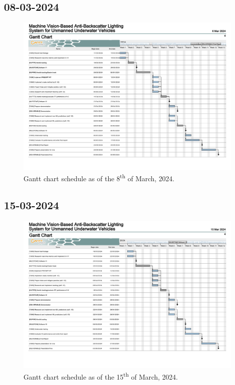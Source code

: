 \subsection{08-03-2024}

\begin{figure}[H]
    \centering
    \includegraphics[width=1\textwidth]{assets/gantt1.png}
    \caption{Gantt chart schedule as of the 8\textsuperscript{th} of March, 2024.}
    \label{fig:gantt1}
\end{figure}

\subsection{15-03-2024}

\begin{figure}[H]
    \centering
    \includegraphics[width=1\textwidth]{assets/gantt2.png}
    \caption{Gantt chart schedule as of the 15\textsuperscript{th} of March, 2024.}
    \label{fig:gantt2}
\end{figure}

